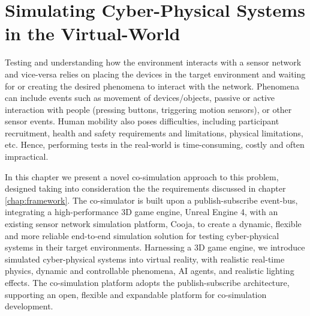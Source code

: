 \chapter{Simulating Cyber-Physical Systems in the Virtual-World}

Testing and understanding how the environment interacts with a sensor network and vice-versa relies on placing the devices in the target environment and waiting for or creating the desired phenomena to interact with the network. Phenomena can include events such as movement of devices/objects, passive or active interaction with people (pressing buttons, triggering motion sensors), or other sensor events. Human mobility also poses difficulties, including participant recruitment, health and safety requirements and limitations, physical limitations, etc. Hence, performing tests in the real-world is time-consuming, costly and often impractical. 



In this chapter we present a novel co-simulation approach to this problem, designed taking into consideration the the requirements discussed in chapter \ref{chap:framework}. The co-simulator is built upon a publish-subscribe event-bus, integrating a high-performance 3D game engine, Unreal Engine 4, with an existing sensor network simulation platform, Cooja, to create a dynamic, flexible and more reliable end-to-end simulation solution for testing cyber-physical systems in their target environments. Harnessing a 3D game engine, we introduce simulated cyber-physical systems into virtual reality, with realistic real-time physics, dynamic and controllable phenomena, AI agents, and realistic lighting effects. The co-simulation platform adopts the publish-subscribe architecture, supporting an open, flexible and expandable platform for co-simulation development.



